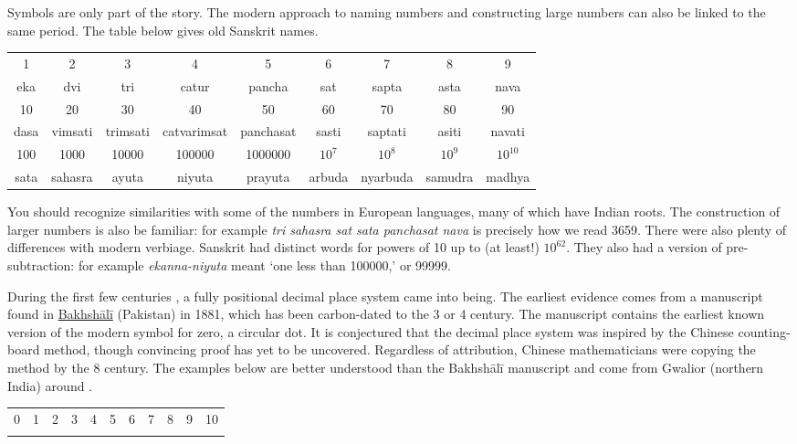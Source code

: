 Symbols are only part of the story. The modern approach to naming numbers and constructing large numbers can also be linked to the same period. The table below gives old Sanskrit names.
\begin{center}
	\begin{tabular}{ccccccccc}
		1&2&3&4&5&6&7&8&9\\
		eka&dvi&tri&catur&pancha&sat&sapta&asta&nava\\[0.3cm]
		10&20&30&40&50&60&70&80&90\\
		dasa&vimsati&trimsati&catvarimsat&panchasat&sasti&saptati&asiti&navati\\[0.3cm]
		100&1000&10000&100000&1000000&$10^7$&$10^8$&$10^9$&$10^{10}$\\
		sata&sahasra&ayuta&niyuta&prayuta&arbuda&nyarbuda&samudra&madhya
	\end{tabular}
\end{center}
You should recognize similarities with some of the numbers in European languages, many of which have Indian roots. The construction of larger numbers is also be familiar: for example \emph{tri sahasra sat sata panchasat nava} is precisely how we read 3659.
\smallbreak
There were also plenty of differences with modern verbiage. Sanskrit had distinct words for powers of 10 up to (at least!) $10^{62}$. They also had a version of pre-subtraction: for example \emph{ekanna-niyuta} meant `one less than 100000,' or 99999.



During the first few centuries \AD{}, a fully positional decimal place system came into being. The earliest evidence comes from a manuscript found in \href{http://www.bbc.com/news/uk-england-oxfordshire-41265057}{Bakhshālī} (Pakistan) in 1881, which has been carbon-dated to the 3\rd{} or 4\th{} century. The manuscript contains the earliest known version of the modern symbol for zero, a circular dot. It is conjectured that the decimal place system was inspired by the Chinese counting-board method, though convincing proof has yet to be uncovered. Regardless of attribution, Chinese mathematicians were copying the method by the 8\th{} century.\smallbreak
The examples below are better understood than the Bakhshālī manuscript and come from Gwalior (northern India) around .
\begin{center}
	\begin{tabular}{ccccccccccc}
		0&1&2&3&4&5&6&7&8&9&10\\
		\IndiaGzero&\IndiaGone&\IndiaGtwo&\IndiaGthree&\IndiaGfour&\IndiaGfive&\IndiaGsix&\IndiaGseven&\IndiaGeight&\IndiaGnine&\IndiaGten
	\end{tabular}
\end{center}

